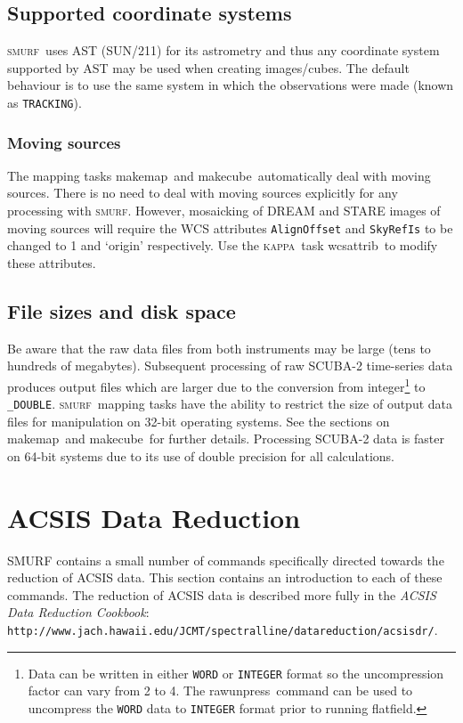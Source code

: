 \documentclass[twoside,11pt]{article}
\newcommand{\htmladdnormallink}[2]{#1}
\newcommand{\xref}[3]{#1}
\newcommand{\xlabel}[1]{}
\renewcommand{\_}{\texttt{\symbol{95}}}
\newcommand{\KAPPA}{\textsc{kappa}}
\newcommand{\SMURF}{\textsc{smurf}}
\newcommand{\astref}{\xref{SUN/211}{sun211}{}}
\newcommand{\task}[1]{\textsf{#1}}
\newcommand{\makecube}{\xref{\task{makecube}}{sun258}{MAKECUBE}}
\newcommand{\rawunpress}{\xref{\task{rawunpress}}{sun258}{RAWUNPRESS}}
\newcommand{\flatfield}{\xref{\task{flatfield}}{sun258}{FLATFIELD}}
\newcommand{\makemap}{\xref{\task{makemap}}{sun258}{MAKEMAP}}
\newcommand{\wcsattrib}{\xref{\task{wcsattrib}}{sun95}{WCSATTRIB}}
\newcommand{\aparam}[1]{\texttt{#1}}     %
\begin{document}
\subsection{Supported coordinate systems}

\SMURF\ uses AST (\astref) for its astrometry and thus any coordinate
system supported by AST may be used when creating images/cubes. The
default behaviour is to use the same system in which the observations
were made (known as \aparam{TRACKING}).

\subsubsection{Moving sources}

The mapping tasks \makemap\ and \makecube\ automatically
deal with moving sources. There is no need to deal with moving sources
explicitly for any processing with \SMURF. However, mosaicking of
DREAM and STARE images of moving sources will require the WCS
attributes \verb+AlignOffset+ and \verb+SkyRefIs+ to be changed to 1
and `origin' respectively. Use the \KAPPA\ task \wcsattrib\ to
modify these attributes.

\subsection{File sizes and disk space}

Be aware that the raw data files from both instruments may be large
(tens to hundreds of megabytes). Subsequent processing of raw SCUBA-2
time-series data produces output files which are larger due to the
conversion from integer\footnote{Data can be written in either
  \texttt{\_WORD} or \texttt{\_INTEGER} format so the uncompression
  factor can vary from 2 to 4. The \rawunpress\ command can be used to
  uncompress the \texttt{\_WORD} data to \texttt{\_INTEGER} format
  prior to running \flatfield.}  to \verb+_DOUBLE+. \SMURF\ mapping
tasks have the ability to restrict the size of output data files for
manipulation on 32-bit operating systems. See the sections on
\makemap\ and \makecube\ for further details. Processing
SCUBA-2 data is faster on 64-bit systems due to its use of double
precision for all calculations.

\section{\xlabel{acsis}ACSIS Data Reduction\label{se:acsisdr}}

SMURF contains a small number of commands specifically directed towards
the reduction of ACSIS data. This section contains an introduction to
each of these commands. The reduction of ACSIS data is described
more fully in the {\em ACSIS Data Reduction Cookbook}:
\htmladdnormallink{\texttt{http://www.jach.hawaii.edu/JCMT/spectral\_line/data\_reduction/acsisdr/}}
{http://www.jach.hawaii.edu/JCMT/spectral_line/data_reduction/acsisdr/}.
\end{document}
